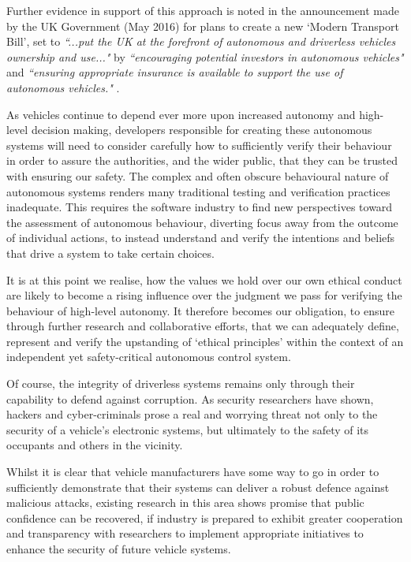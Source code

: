 \documentclass[conference]{IEEEtran}
\begin{document}
Further evidence in support of this approach is noted in the announcement made by the UK Government (May 2016) for plans to create a new `Modern Transport Bill', set to \textit{``...put the UK at the forefront of autonomous and driverless vehicles ownership and use..."} by \textit{``encouraging potential investors in autonomous vehicles"} and \textit{``ensuring appropriate insurance is available to support the use of autonomous vehicles."} \cite{modern-transport-bill}.

As vehicles continue to depend ever more upon increased autonomy and high-level decision making, developers responsible for creating these autonomous systems will need to consider carefully how to sufficiently verify their behaviour in order to assure the authorities, and the wider public, that they can be trusted with ensuring our safety. The complex and often obscure behavioural nature of autonomous systems renders many traditional testing and verification practices inadequate. This requires the software industry to find new perspectives toward the assessment of autonomous behaviour, diverting focus away from the outcome of individual actions, to instead understand and verify the intentions and beliefs that drive a system to take certain choices. 

It is at this point we realise, how the values we hold over our own ethical conduct are likely to become a rising influence over the judgment we pass for verifying the behaviour of high-level autonomy. It therefore becomes our obligation, to ensure through further research and collaborative efforts, that we can adequately define, represent and verify the upstanding of `ethical principles' within the context of an independent yet safety-critical autonomous control system.

Of course, the integrity of driverless systems remains only through their capability to defend against corruption. As security researchers have shown, hackers and cyber-criminals prose a real and worrying threat not only to the security of a vehicle's electronic systems, but ultimately to the safety of its occupants and others in the vicinity. 

Whilst it is clear that vehicle manufacturers have some way to go in order to sufficiently demonstrate that their systems can deliver a robust defence against malicious attacks, existing research in this area shows promise that public confidence can be recovered, if industry is prepared to exhibit greater cooperation and transparency with researchers to implement appropriate initiatives to enhance the security of future vehicle systems.
\end{document}
